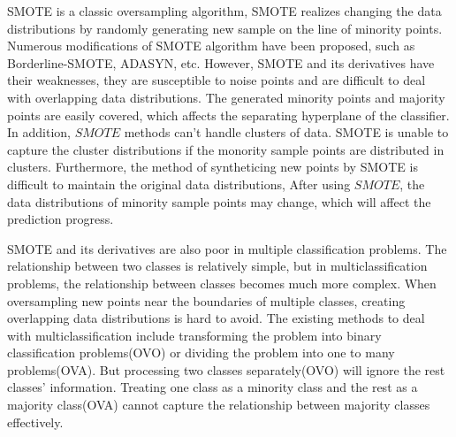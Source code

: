 \documentclass[runningheads]{llncs}
\begin{document}
SMOTE is a classic oversampling algorithm,
SMOTE realizes changing the data distributions by randomly generating new sample 
on the line of minority points.
Numerous modifications of SMOTE algorithm have been proposed, such as
Borderline-SMOTE\cite{2005Borderline}, ADASYN\cite{2008ADASYN}, etc. 
However, SMOTE and its derivatives have their weaknesses,
they are susceptible to noise points and are difficult to deal with
 overlapping data distributions.
The generated minority points and majority points are easily covered, 
which affects the separating hyperplane of the classifier. 
In addition, $SMOTE$ methods can't handle
clusters of data. SMOTE is unable to capture the cluster distributions
if the monority sample points are distributed in clusters.
Furthermore,
the method of syntheticing new points by SMOTE is difficult to 
maintain the original data distributions\cite{2008DATA},
After using $SMOTE$, 
the data distributions of minority sample points may change,
which will affect the prediction progress.


 SMOTE and its derivatives are also poor in multiple classification problems\cite{2020Combined}. 
 The relationship between two classes is relatively simple,
but in multiclassification problems, the relationship 
between classes becomes much more complex\cite{2017Relevance}.
When oversampling new points near the boundaries of multiple classes, 
creating overlapping data distributions\cite{Jierui2013Overlapping} is hard to avoid.
The existing methods to deal with multiclassification include transforming 
the problem into binary classification problems(OVO)\cite{articlemulti} or 
dividing the problem into one to many problems(OVA).
But processing two classes separately(OVO) will ignore the rest classes' information.
Treating one class as a minority class and the rest as a majority class(OVA)
cannot capture the relationship between majority classes effectively.
\end{document}

